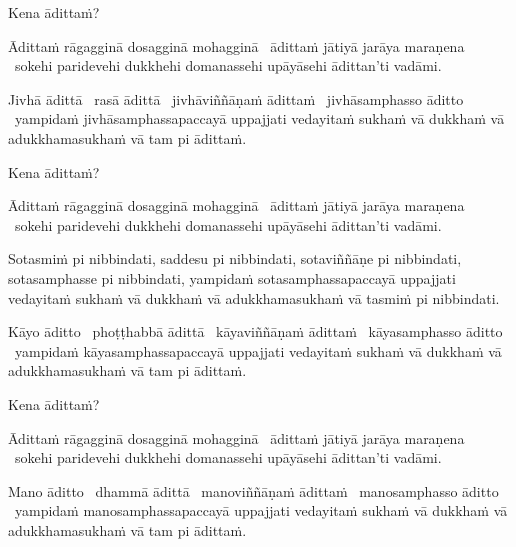 Kena ādittaṁ?

\begin{pali-hang}
  Ādittaṁ rāgagginā dosagginā mohagginā \breathmark\ ādittaṁ jātiyā jarāya maraṇena \breathmark\ sokehi paridevehi dukkhehi domanassehi upāyāsehi ādittan'ti vadāmi.
\end{pali-hang}

\begin{pali-hang}
  Jivhā ādittā \breathmark\ rasā ādittā \breathmark\ jivhāviññāṇaṁ ādittaṁ \breathmark\ jivhāsamphasso āditto \breathmark\ yampidaṁ jivhāsamphassapaccayā uppajjati vedayitaṁ sukhaṁ vā dukkhaṁ vā adukkhamasukhaṁ vā tam pi ādittaṁ.
\end{pali-hang}

Kena ādittaṁ?

\begin{pali-hang}
  Ādittaṁ rāgagginā dosagginā mohagginā \breathmark\ ādittaṁ jātiyā jarāya maraṇena \breathmark\ sokehi paridevehi dukkhehi domanassehi upāyāsehi ādittan'ti vadāmi.
\end{pali-hang}

\begin{pali-hang}
  Sotasmiṁ pi nibbindati, saddesu pi nibbindati, sotaviññāṇe pi
  nibbindati, sotasamphasse pi nibbindati, yampidaṁ sotasamphassapaccayā
  uppajjati vedayitaṁ sukhaṁ vā dukkhaṁ vā adukkhamasukhaṁ vā tasmiṁ pi
  nibbindati.
\end{pali-hang}

\begin{pali-hang}
  Kāyo āditto \breathmark\ phoṭṭhabbā ādittā \breathmark\ kāyaviññāṇaṁ ādittaṁ \breathmark\ kāyasamphasso āditto \breathmark\ yampidaṁ kāyasamphassapaccayā uppajjati vedayitaṁ sukhaṁ vā dukkhaṁ vā adukkhamasukhaṁ vā tam pi ādittaṁ.
\end{pali-hang}

Kena ādittaṁ?

\begin{pali-hang}
  Ādittaṁ rāgagginā dosagginā mohagginā \breathmark\ ādittaṁ jātiyā jarāya maraṇena \breathmark\ sokehi paridevehi dukkhehi domanassehi upāyāsehi ādittan'ti vadāmi.
\end{pali-hang}

\begin{pali-hang}
  Mano āditto \breathmark\ dhammā ādittā \breathmark\ manoviññāṇaṁ ādittaṁ \breathmark\ manosamphasso āditto \breathmark\ yampidaṁ manosamphassapaccayā uppajjati vedayitaṁ sukhaṁ vā dukkhaṁ vā adukkhamasukhaṁ vā tam pi ādittaṁ.
\end{pali-hang}

